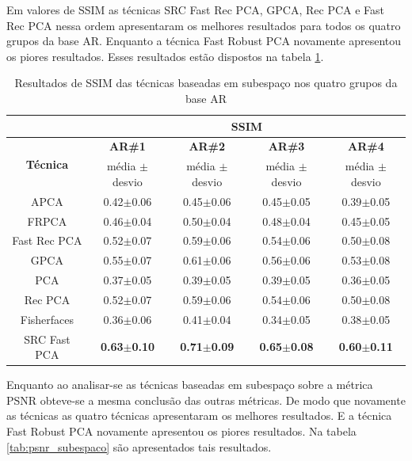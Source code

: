 Em valores de SSIM as técnicas SRC Fast Rec PCA, GPCA, Rec PCA e Fast Rec PCA nessa ordem apresentaram os melhores resultados para todos os quatro grupos da base AR. Enquanto a técnica Fast Robust PCA novamente apresentou os piores resultados. Esses resultados estão dispostos na tabela \ref{tab:ssim_subespaco}.


\begin{table}[H]
\caption{Resultados de SSIM das técnicas baseadas em subespaço nos quatro grupos da base AR}
\centering
\begin{tabular}{|c|c|c|c|c|}
\cline{2-5}
 \multicolumn{1}{c|}{} & \multicolumn{4}{c|}{\textbf{SSIM}}\\ \hline
\multicolumn{1}{|c|}{\multirow{2}{*}{\textbf{Técnica} }}& \textbf{AR\#1} &  \textbf{AR\#2} & \textbf{AR\#3} & \textbf{AR\#4}   \\ \cline{2-5}
& média $\pm$ desvio & média $\pm$ desvio & média $\pm$ desvio & média $\pm$ desvio \\\hline 
APCA			&0.42$\pm$0.06	&0.45$\pm$0.06	&0.45$\pm$0.05&	0.39$\pm$0.05\\\hline
FRPCA			&0.46$\pm$0.04	&0.50$\pm$0.04	&0.48$\pm$0.04&	0.45$\pm$0.05\\\hline
Fast Rec PCA	&0.52$\pm$0.07	&0.59$\pm$0.06	&0.54$\pm$0.06&	0.50$\pm$0.08\\\hline
GPCA			&0.55$\pm$0.07	&0.61$\pm$0.06	&0.56$\pm$0.06&	0.53$\pm$0.08\\\hline
PCA				&0.37$\pm$0.05	&0.39$\pm$0.05	&0.39$\pm$0.05&	0.36$\pm$0.05\\\hline
Rec PCA			&0.52$\pm$0.07	&0.59$\pm$0.06	&0.54$\pm$0.06&	0.50$\pm$0.08\\\hline
Fisherfaces		&0.36$\pm$0.06	&0.41$\pm$0.04	&0.34$\pm$0.05&	0.38$\pm$0.05\\\hline
SRC Fast PCA    &\textbf{0.63$\pm$0.10}	&\textbf{0.71$\pm$0.09}	&\textbf{0.65$\pm$0.08}&	\textbf{0.60$\pm$0.11}\\\hline
\end{tabular}
\label{tab:ssim_subespaco}
\end{table}

Enquanto ao analisar-se as técnicas baseadas em subespaço sobre a métrica PSNR obteve-se a mesma conclusão das outras métricas. De modo que novamente as técnicas as quatro técnicas apresentaram os melhores resultados. E a técnica Fast Robust PCA novamente apresentou os piores resultados. Na tabela \ref{tab:psnr_subespaco} são apresentados tais resultados. 

